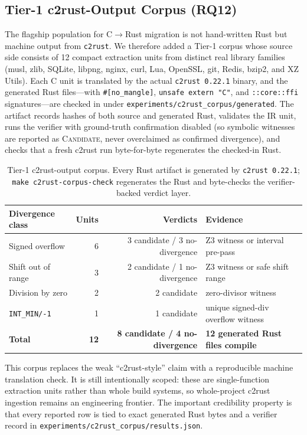 \documentclass[10pt,a4paper]{article}
\begin{document}
\subsection{Tier-1 c2rust-Output Corpus (RQ12)}\label{sec:eval-c2rust-corpus}

The flagship population for C$\to$Rust migration is not hand-written Rust but
machine output from \texttt{c2rust}. We therefore added a Tier-1 corpus whose
source side consists of 12 compact extraction units from distinct real library
families (musl, zlib, SQLite, libpng, nginx, curl, Lua, OpenSSL, git, Redis,
bzip2, and XZ Utils). Each C unit is translated by the actual
\texttt{c2rust 0.22.1} binary, and the generated Rust files---with
\texttt{\#[no\_mangle]}, \texttt{unsafe extern "C"}, and
\texttt{::core::ffi} signatures---are checked in under
\texttt{experiments/c2rust\_corpus/generated}. The artifact records hashes of
both source and generated Rust, validates the IR unit, runs the verifier with
ground-truth confirmation disabled (so symbolic witnesses are reported as
\textsc{Candidate}, never overclaimed as confirmed divergence), and checks that a
fresh c2rust run byte-for-byte regenerates the checked-in Rust.

\begin{table}[t]
\centering
\small
\caption{Tier-1 c2rust-output corpus. Every Rust artifact is generated by
\texttt{c2rust 0.22.1}; \texttt{make c2rust-corpus-check} regenerates the Rust
and byte-checks the verifier-backed verdict layer.}
\label{tab:c2rust-corpus}
\begin{tabular}{@{}lrrl@{}}
\toprule
Divergence class & Units & Verdicts & Evidence \\
\midrule
Signed overflow & 6 & 3 candidate / 3 no-divergence & Z3 witness or interval pre-pass \\
Shift out of range & 3 & 2 candidate / 1 no-divergence & Z3 witness or safe shift range \\
Division by zero & 2 & 2 candidate & zero-divisor witness \\
\texttt{INT\_MIN/-1} & 1 & 1 candidate & unique signed-div overflow witness \\
\midrule
\textbf{Total} & \textbf{12} & \textbf{8 candidate / 4 no-divergence} &
\textbf{12 generated Rust files compile} \\
\bottomrule
\end{tabular}
\end{table}

This corpus replaces the weak ``c2rust-style'' claim with a reproducible machine
translation check. It is still intentionally scoped: these are single-function
extraction units rather than whole build systems, so whole-project c2rust
ingestion remains an engineering frontier. The important credibility property is
that every reported row is tied to exact generated Rust bytes and a verifier
record in \texttt{experiments/c2rust\_corpus/results.json}.
\end{document}
